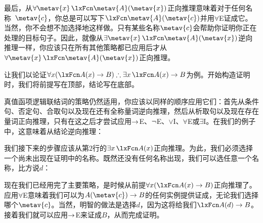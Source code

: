 最后，从$\forall \metav{x}\, \atom{\metav{A}}{\metav{x}}$正向推理意味着对于任何名称~$\metav{c}$，你总是可以写下$\atom{\metav{A}}{\metav{c}}$并用$\forall$E证成它。当然，你不会想不加选择地这样做。只有某些名称$\metav{c}$会帮助你证明你正在处理的目标句子。因此，就像从$\exists \metav{x}\, \atom{\metav{A}}{\metav{x}}$逆向推理一样，你应该只在所有其他策略都已应用后才从$\forall \metav{x}\, \atom{\metav{A}}{\metav{x}}$正向推理。

让我们以论证$\forall x(\atom{A}{x} \eif B) \therefore \exists x\,\atom{A}{x} \eif B$为例。开始构造证明时，我们将前提写在顶部，结论写在底部。


\begin{fitchproof}
\PR
\ellipsesline
{}
\end{fitchproof}


真值函项逻辑联结词的策略仍然适用，你应该以同样的顺序应用它们：首先从条件句、否定句、合取句以及现在还有全称量词逆向推理，然后从析取句以及现在存在量词正向推理，只有在这之后才尝试应用$\rightarrow$E、$\neg$E、$\lor$I、$\forall$E或$\exists$I。在我们的例子中，这意味着从结论逆向推理：


\begin{fitchproof}
	\PR
	\open
	\AS
	\ellipsesline
	\close
\end{fitchproof}


我们接下来的步骤应该从第$2$行的$\exists x\,\atom{A}{x}$正向推理。为此，我们必须选择一个尚未出现在证明中的名称。既然还没有任何名称出现，我们可以选任意一个名称，比方说$d$：


\begin{fitchproof}
	\PR
	\open
	\AS
	\open
	\AS
	\ellipsesline
	\close
	\close
\end{fitchproof}


现在我们已经用完了主要策略，是时候从前提$\forall x(\atom{A}{x} \eif B)$正向推理了。应用$\forall$E意味着我们可以为$A(\metav{c}) \eif B$的任何实例提供证成，无论我们选择哪个$\metav{c}$。当然，明智的做法是选择$d$，因为这将给我们$\atom{A}{d} \eif B$。接着我们就可以应用$\rightarrow$E来证成$B$，从而完成证明。


\begin{fitchproof}
	\PR
	\open
	\AS
	\open
	\AS
{}
	\close
	\close
\end{fitchproof}

